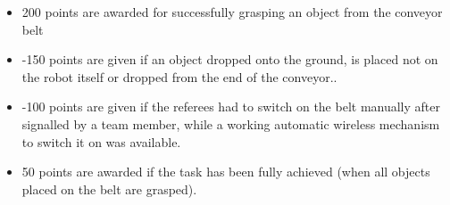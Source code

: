 \begin{itemize}
\item 200 points are awarded for successfully grasping an object from the conveyor belt 
\item -150 points are given if an object dropped onto the ground, is placed not on the robot itself or dropped from the end of the conveyor..
\item -100 points are given if the referees had to switch on the belt manually after signalled by a team member, while a working automatic wireless mechanism to switch it on was available.
\item 50 points are awarded if the task has been fully achieved (when all objects placed on the belt are grasped).
\end{itemize}
